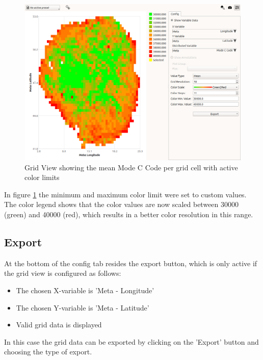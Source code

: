 \begin{figure}[H]
    \hspace*{-2cm}
    \includegraphics[width=18cm,frame]{figures/grid_modec_mean_limits.png}
  \caption{Grid View showing the mean Mode C Code per grid cell with active color limits}
  \label{fig:grid_view_color_example2}
\end{figure}

In figure \ref{fig:grid_view_color_example2} the minimum and maximum color limit were set to custom values.
The color legend shows that the color values are now scaled between 30000 (green) and 40000 (red),
which results in a better color resolution in this range.

\subsection{Export}

At the bottom of the config tab resides the export button, which is only active if the grid view is configured as follows:

\begin{itemize}
    \item The chosen X-variable is 'Meta - Longitude' 
    \item The chosen Y-variable is 'Meta - Latitude'
    \item Valid grid data is displayed
\end{itemize}

In this case the grid data can be exported by clicking on the 'Export' button and choosing the type of export. \\

